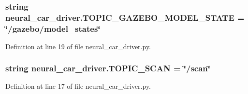 \subsubsection[{\texorpdfstring{T\+O\+P\+I\+C\+\_\+\+G\+A\+Z\+E\+B\+O\+\_\+\+M\+O\+D\+E\+L\+\_\+\+S\+T\+A\+TE}{TOPIC_GAZEBO_MODEL_STATE}}]{\setlength{\rightskip}{0pt plus 5cm}string neural\+\_\+car\+\_\+driver.\+T\+O\+P\+I\+C\+\_\+\+G\+A\+Z\+E\+B\+O\+\_\+\+M\+O\+D\+E\+L\+\_\+\+S\+T\+A\+TE = \char`\"{}/gazebo/model\+\_\+states\char`\"{}}\hypertarget{namespaceneural__car__driver_a8e8319dbdbdbc3c32c3184c82f9c3f80}{}\label{namespaceneural__car__driver_a8e8319dbdbdbc3c32c3184c82f9c3f80}


Definition at line 19 of file neural\+\_\+car\+\_\+driver.\+py.

\subsubsection[{\texorpdfstring{T\+O\+P\+I\+C\+\_\+\+S\+C\+AN}{TOPIC_SCAN}}]{\setlength{\rightskip}{0pt plus 5cm}string neural\+\_\+car\+\_\+driver.\+T\+O\+P\+I\+C\+\_\+\+S\+C\+AN = \char`\"{}/scan\char`\"{}}\hypertarget{namespaceneural__car__driver_aa0a0413ce25fecb4d35f07c7fea06a8c}{}\label{namespaceneural__car__driver_aa0a0413ce25fecb4d35f07c7fea06a8c}


Definition at line 17 of file neural\+\_\+car\+\_\+driver.\+py.

